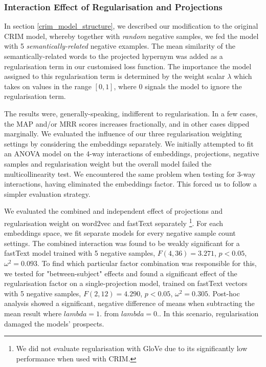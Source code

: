 \subsubsection{Interaction Effect of Regularisation and Projections}
In section \ref{crim_model_structure}, we described our modification to the original CRIM model, whereby together with \textit{random} negative samples, we fed the model with 5 \textit{semantically-related} negative examples.  The mean similarity of the semantically-related words to the projected hypernym was added as a regularisation term in our customised loss function.  The importance the model assigned to this regularisation term is determined by the weight scalar $\lambda$ which takes on values in the range $[0,1]$, where 0 signals the model to ignore the regularisation term. 

The results were, generally-speaking, indifferent to regularisation.  In a few cases, the \ac{MAP} and/or \ac{MRR} scores increases fractionally, and in other cases dipped marginally.  We evaluated the influence of our three regularisation weighting settings by considering the embeddings separately.  We initially attempted to fit an \ac{ANOVA} model on the 4-way interactions of embeddings, projections, negative samples and regularisation weight but the overall model failed the multicollinearity test.  We encountered the same problem when testing for 3-way interactions, having eliminated the embeddings factor.  This forced us to follow a simpler evaluation strategy. 

We evaluated the combined and independent effect of projections and regularisation weight on word2vec and fastText separately \footnote{We did not evaluate regularisation with GloVe due to its significantly low performance when used with CRIM.}.  For each embeddings space, we fit separate models for every negative sample count settings.  The combined interaction was found to be weakly significant for a fastText model trained with 5 negative samples, $F(4,36)=3.271$, $p < 0.05$, $\omega^2=0.093$.  To find which particular factor combination was responsible for this, we tested for "between-subject" effects and found a significant effect of the regularisation factor on a single-projection model, trained on fastText vectors with 5 negative samples, $F(2,12)=4.290$, $p <  0.05$, $\omega^2=0.305$.  Post-hoc analysis showed a significant, negative difference of means when subtracting the mean result where $lambda=1.$  from $lambda=0.$.  In this scenario, regularisation damaged the models' prospects.

